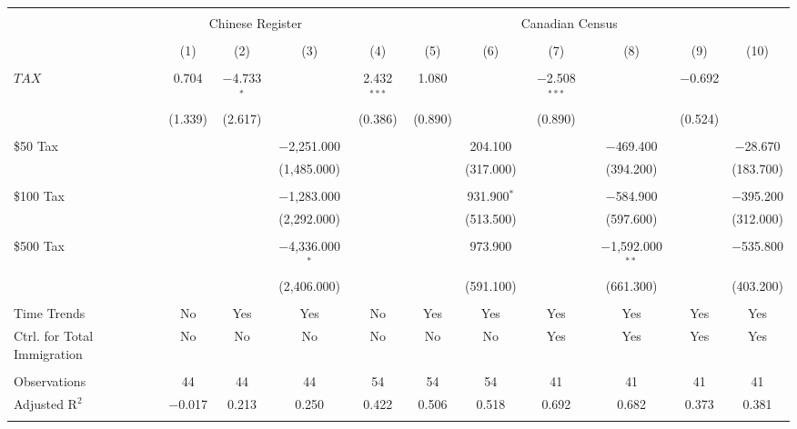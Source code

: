 
\begin{tabular}{@{\extracolsep{5pt}}lcccccccccc} 
\\[-1.8ex]\hline 
\hline \\[-1.8ex] 
 & \multicolumn{3}{c}{Chinese Register} & \multicolumn{7}{c}{Canadian Census} \\ 
\\[-1.8ex] & (1) & (2) & (3) & (4) & (5) & (6) & (7) & (8) & (9) & (10)\\ 
\hline \\[-1.8ex] 
 $TAX$ & 0.704 & $-$4.733$^{*}$ &  & 2.432$^{***}$ & 1.080 &  & $-$2.508$^{***}$ &  & $-$0.692 &  \\ 
  & (1.339) & (2.617) &  & (0.386) & (0.890) &  & (0.890) &  & (0.524) &  \\ 
  & & & & & & & & & & \\ 
 \$50 Tax &  &  & $-$2,251.000 &  &  & 204.100 &  & $-$469.400 &  & $-$28.670 \\ 
  &  &  & (1,485.000) &  &  & (317.000) &  & (394.200) &  & (183.700) \\ 
  & & & & & & & & & & \\ 
 \$100 Tax &  &  & $-$1,283.000 &  &  & 931.900$^{*}$ &  & $-$584.900 &  & $-$395.200 \\ 
  &  &  & (2,292.000) &  &  & (513.500) &  & (597.600) &  & (312.000) \\ 
  & & & & & & & & & & \\ 
 \$500 Tax &  &  & $-$4,336.000$^{*}$ &  &  & 973.900 &  & $-$1,592.000$^{**}$ &  & $-$535.800 \\ 
  &  &  & (2,406.000) &  &  & (591.100) &  & (661.300) &  & (403.200) \\ 
  & & & & & & & & & & \\ 
Time Trends & No & Yes & Yes & No & Yes & Yes & Yes & Yes & Yes & Yes \\ 
Ctrl. for Total Immigration & No & No & No & No & No & No & Yes & Yes & Yes & Yes \\ 
\hline \\[-1.8ex] 
Observations & 44 & 44 & 44 & 54 & 54 & 54 & 41 & 41 & 41 & 41 \\ 
Adjusted R$^{2}$ & $-$0.017 & 0.213 & 0.250 & 0.422 & 0.506 & 0.518 & 0.692 & 0.682 & 0.373 & 0.381 \\ 
\hline \\[-1.8ex] 
\end{tabular} 
